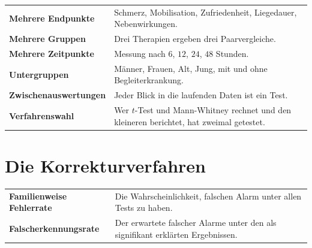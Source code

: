\begin{warnung}
\begin{center}
{\small
\renewcommand{\arraystretch}{1.5}
\begin{tabular}{@{}P{3.0cm}P{5.6cm}@{}}
\toprule
\textbf{Mehrere End\-punkte} & Schmerz, Mobilisation, Zufriedenheit, Liegedauer, Nebenwirkungen.\\
\textbf{Mehrere Gruppen} & Drei Therapien ergeben drei Paarvergleiche.\\
\textbf{Mehrere Zeitpunkte} & Messung nach $6$, $12$, $24$, $48$ Stunden.\\
\textbf{Untergruppen} & Männer, Frauen, Alt, Jung, mit und ohne Begleiterkrankung.\\
\textbf{Zwischen\-auswertungen} & Jeder Blick in die laufenden Daten ist ein Test.\\
\textbf{\textcolor{akzent}{Verfahrens\-wahl}} & \textcolor{akzent}{Wer $t$-Test und Mann-Whitney rechnet und den kleineren berichtet, hat zweimal getestet.}\\
\bottomrule
\end{tabular}}
\end{center}

\begin{center}
\begin{minipage}{0.88\textwidth}
\end{minipage}
\end{center}
\end{warnung}

\section{Die Korrekturverfahren}

\begin{definition}
\begin{center}
{\small
\renewcommand{\arraystretch}{1.55}
\begin{tabular}{@{}P{3.4cm}P{5.2cm}@{}}
\toprule
\textbf{Familienweise Fehlerrate} & Die Wahrscheinlichkeit,  falschen Alarm unter allen Tests zu haben.\\
\textbf{Falscher\-kennungsrate} & Der erwartete  falscher Alarme unter den als signifikant erklärten Ergebnissen.\\
\bottomrule
\end{tabular}}
\end{center}
\end{definition}


